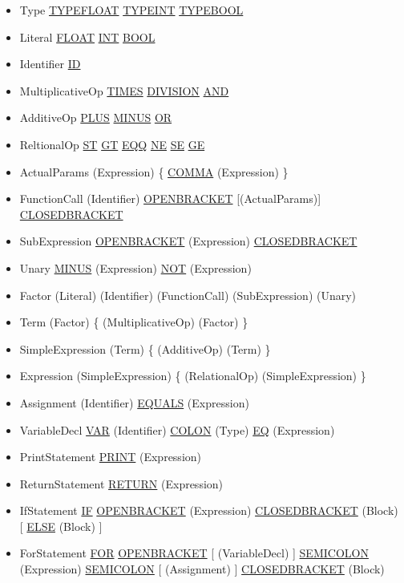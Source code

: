 \begin{itemize}
	\item Type
		\subitem \ul{TYPE\un FLOAT}
		\subitem \ul{TYPE\un INT}
		\subitem \ul{TYPE\un BOOL}
	\item Literal
		\subitem \ul{FLOAT}
		\subitem \ul{INT}
		\subitem \ul{BOOL}
	\item Identifier
		\subitem \ul{ID}
	\item MultiplicativeOp
		\subitem \ul{TIMES}
		\subitem \ul{DIVISION}
		\subitem \ul{AND}
	\item AdditiveOp
		\subitem \ul{PLUS}
		\subitem \ul{MINUS}
		\subitem \ul{OR}
	\item ReltionalOp
		\subitem \ul{ST}
		\subitem \ul{GT}
		\subitem \ul{EQQ}
		\subitem \ul{NE}
		\subitem \ul{SE}
		\subitem \ul{GE}
	\item ActualParams
		\subitem (Expression) \{ \ul{COMMA} (Expression) \}
	\item FunctionCall
		\subitem (Identifier) \ul{OPEN\un BRACKET} [(ActualParams)] \ul{CLOSED\un BRACKET}
	\item SubExpression 
		\subitem \ul{OPEN\un BRACKET} (Expression) \ul{CLOSED\un BRACKET}
	\item Unary
		\subitem \ul{MINUS} (Expression)
		\subitem \ul{NOT} (Expression)
	\item Factor
		\subitem (Literal)
		\subitem (Identifier)
		\subitem (FunctionCall)
		\subitem (SubExpression)
		\subitem (Unary)
	\item Term
		\subitem (Factor) \{ (MultiplicativeOp) (Factor) \}
	\item SimpleExpression
		\subitem (Term) \{ (AdditiveOp) (Term) \}
	\item Expression
		\subitem (SimpleExpression) \{ (RelationalOp) (SimpleExpression) \}
	\item Assignment
		\subitem (Identifier) \ul{EQUALS} (Expression)
	\item VariableDecl
		\subitem \ul{VAR} (Identifier) \ul{COLON} (Type)	\ul{EQ} (Expression)
	\item PrintStatement
		\subitem \ul{PRINT} (Expression)
	\item ReturnStatement
		\subitem \ul{RETURN} (Expression)
	\item IfStatement
		\subitem \ul{IF} \ul{OPEN\un BRACKET} (Expression) \ul{CLOSED\un BRACKET} (Block) [ \ul{ELSE} (Block) ]
	\item ForStatement
		\subitem \ul{FOR} \ul{OPEN\un BRACKET} [ (VariableDecl) ] \ul{SEMI\un COLON} (Expression) \ul{SEMI\un COLON} [ (Assignment) ] \ul{CLOSED\un BRACKET} (Block)

\end{itemize}
